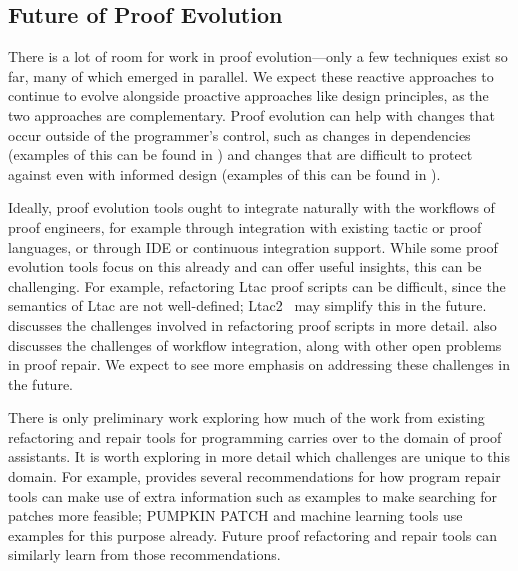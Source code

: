 

\subsection{Future of Proof Evolution}

There is a lot of room for work in proof evolution---only a few techniques exist so far, 
many of which emerged in parallel. We expect these reactive approaches to continue to evolve alongside proactive
approaches like design principles, as the two approaches are complementary.
Proof evolution can help with changes that occur outside of the programmer's control,
such as changes in dependencies (examples of this can be found in \cite{Ringer2018}) and changes that are difficult to protect against
even with informed design (examples of this can be found in \cite{Klein2014}).

Ideally, proof evolution tools ought to integrate naturally with the workflows of proof engineers,
for example through integration with existing tactic or proof languages, or through IDE or continuous integration support.
While some proof evolution tools focus on this already and can offer useful insights, this can be challenging.
For example, refactoring Ltac proof scripts can be difficult, since the semantics of Ltac are not well-defined;
Ltac2~\citep{ltac2} may simplify this in the future.
\cite{robert2018} discusses the challenges involved in refactoring proof scripts in more detail.
\cite{Ringer2018} also discusses the challenges of workflow integration, along with other open problems in proof repair.
We expect to see more emphasis on addressing these challenges in the future.

There is only preliminary work exploring how much of the work from existing refactoring and repair tools
for programming carries over to the domain of proof assistants. It is worth exploring in more detail
which challenges are unique to this domain. For example, \cite{Qi2015} provides several recommendations 
for how program repair tools can make use of extra information such as examples to make searching for patches
more feasible; \textsc{PUMPKIN PATCH} and machine learning tools use examples for this purpose already.
Future proof refactoring and repair tools can similarly learn from those recommendations.

